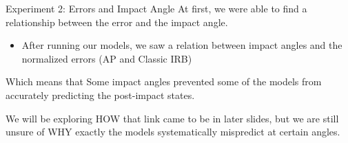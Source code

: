 \begin{frame}{Experiment 2: Errors and Impact Angle}
At first, we were able to find a relationship between the error and the impact angle. 

    \begin{itemize}
        \item After running our models, we saw a relation between impact angles and the normalized errors (AP and Classic IRB)
    \end{itemize} 
\vspace{0.5\baselineskip}
Which means that Some impact angles prevented some of the models from accurately predicting the post-impact states.
    
    \vspace{0.5\baselineskip}
     We will be exploring HOW that link came to be in later slides, but we are still unsure of WHY exactly the models systematically mispredict at certain angles.
\end{frame}

